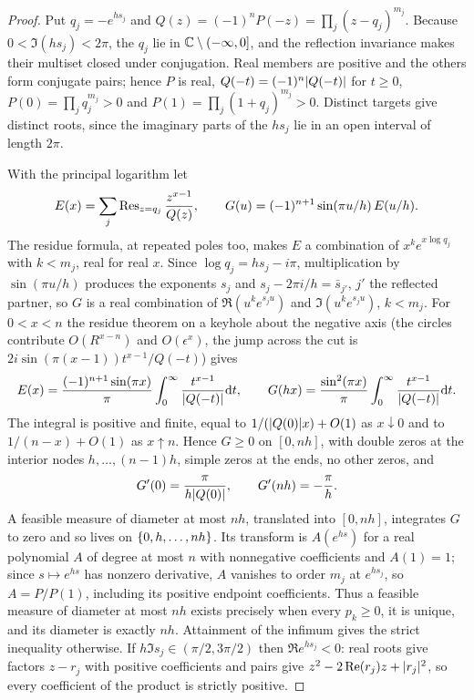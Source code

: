 \begin{proof}
Put $q_j=-e^{hs_j}$ and $Q(z)=(-1)^nP(-z)=\prod_j(z-q_j)^{m_j}$. Because $0<\Im(hs_j)<2\pi$, the
$q_j$ lie in $\mathbb{C}\setminus(-\infty,0]$, and the reflection invariance makes their multiset closed under
conjugation. Real members are positive and the others form conjugate pairs; hence $P$ is real,
$Q(-t)=(-1)^n\lvert Q(-t)\rvert$ for $t\ge0$, $P(0)=\prod_jq_j^{m_j}>0$ and $P(1)=\prod_j(1+q_j)^{m_j}>0$.
Distinct targets give distinct roots, since the imaginary parts of the $hs_j$ lie in an open interval of
length $2\pi$.

With the principal logarithm let
\[
 E(x)=\sum_j\operatorname{Res}_{z=q_j}\frac{z^{x-1}}{Q(z)},\qquad G(u)=(-1)^{n+1}\sin(\pi u/h)\,E(u/h).
\]
The residue formula, at repeated poles too, makes $E$ a combination of $x^ke^{x\log q_j}$ with
$k<m_j$, real for real $x$. Since $\log q_j=hs_j-i\pi$, multiplication by $\sin(\pi u/h)$ produces the
exponents $s_j$ and $s_j-2\pi i/h=\bar s_{j'}$, $j'$ the reflected partner, so $G$ is a real
combination of $\Re(u^ke^{s_ju})$ and $\Im(u^ke^{s_ju})$, $k<m_j$. For $0<x<n$ the residue theorem
on a keyhole about the negative axis (the circles contribute $O(R^{x-n})$ and $O(\epsilon^x)$, the jump
across the cut is $2i\sin(\pi(x-1))t^{x-1}/Q(-t)$) gives
\[
 E(x)=\frac{(-1)^{n+1}\sin(\pi x)}\pi\int_0^\infty\frac{t^{x-1}}{\lvert Q(-t)\rvert}\mathrm{d} t,\qquad
 G(hx)=\frac{\sin^2(\pi x)}\pi\int_0^\infty\frac{t^{x-1}}{\lvert Q(-t)\rvert}\mathrm{d} t .
\]
The integral is positive and finite, equal to $1/(\lvert Q(0)\rvert x)+O(1)$ as $x\downarrow0$ and to
$1/(n-x)+O(1)$ as $x\uparrow n$. Hence $G\ge0$ on $[0,nh]$, with double zeros at the interior nodes
$h,\dots,(n-1)h$, simple zeros at the ends, no other zeros, and
\begin{equation}\label{fil:eq:slopes}
 G'(0)=\frac\pi{h\lvert Q(0)\rvert},\qquad G'(nh)=-\frac\pi h .
\end{equation}
A feasible measure of diameter at most $nh$, translated into $[0,nh]$, integrates $G$ to zero and so
lives on $\{0,h,\dots,nh\}$. Its transform is $A(e^{hs})$ for a real polynomial $A$ of degree at
most $n$ with nonnegative coefficients and $A(1)=1$; since $s\mapsto e^{hs}$ has nonzero derivative,
$A$ vanishes to order $m_j$ at $e^{hs_j}$, so $A=P/P(1)$, including its positive endpoint
coefficients. Thus a feasible measure of diameter at most $nh$ exists precisely when every
$p_k\ge0$, it is unique, and its diameter is exactly $nh$. Attainment of the infimum gives the strict
inequality otherwise. If $h\Im s_j\in(\pi/2,3\pi/2)$ then $\Re e^{hs_j}<0$: real roots give factors
$z-r_j$ with positive coefficients and pairs give $z^2-2\operatorname{Re}(r_j)z+\lvert r_j\rvert^2$, so every coefficient of
the product is strictly positive.
\end{proof}

